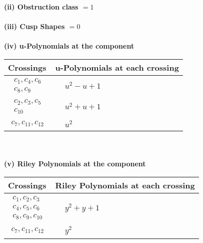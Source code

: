 \documentclass[1p]{elsarticle_modified}
\theoremstyle{definition}
\begin{document}
\flushleft \textbf{(ii) Obstruction class $= 1$}\\~\\
\flushleft \textbf{(iii) Cusp Shapes $= 0$}\\~\\
\newpage\renewcommand{\arraystretch}{1}
\flushleft \textbf{(iv) u-Polynomials at the component}\newline \\
\begin{tabular}{m{50pt}|m{274pt}}
Crossings & \hspace{64pt}u-Polynomials at each crossing \\
\hline $$\begin{aligned}c_{1},c_{4},c_{6}\\c_{8},c_{9}\end{aligned}$$&$\begin{aligned}
&u^2- u+1
\end{aligned}$\\
\hline $$\begin{aligned}c_{2},c_{3},c_{5}\\c_{10}\end{aligned}$$&$\begin{aligned}
&u^2+u+1
\end{aligned}$\\
\hline $$\begin{aligned}c_{7},c_{11},c_{12}\end{aligned}$$&$\begin{aligned}
&u^2
\end{aligned}$\\
\hline
\end{tabular}\\~\\
\newpage\renewcommand{\arraystretch}{1}
\flushleft \textbf{(v) Riley Polynomials at the component}\newline \\
\begin{tabular}{m{50pt}|m{274pt}}
Crossings & \hspace{64pt}Riley Polynomials at each crossing \\
\hline $$\begin{aligned}c_{1},c_{2},c_{3}\\c_{4},c_{5},c_{6}\\c_{8},c_{9},c_{10}\end{aligned}$$&$\begin{aligned}
&y^2+y+1
\end{aligned}$\\
\hline $$\begin{aligned}c_{7},c_{11},c_{12}\end{aligned}$$&$\begin{aligned}
&y^2
\end{aligned}$\\
\hline
\end{tabular}\\~\\
\end{document}
